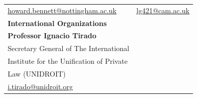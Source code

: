 \documentclass[
  11pt,
  letterpaper]{article}
\begin{document}
\begin{tabular}{p{} p{}}
\href{mailto:howard.bennett@nottingham.ac.uk}{howard.bennett@nottingham.ac.uk} & \href{mailto:lg421@cam.ac.uk}{lg421@cam.ac.uk} \\[1em]
\textbf{International Organizations} & \\[0.5em]
\textbf{Professor Ignacio Tirado} & \\
Secretary General of The International & \\
Institute for the Unification of Private & \\
Law (UNIDROIT) & \\
\href{mailto:i.tirado@unidroit.org}{i.tirado@unidroit.org} & \\
\end{tabular}
\end{document}
